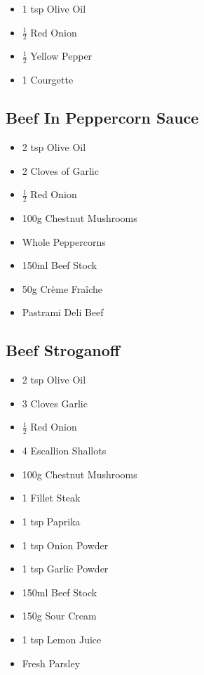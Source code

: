 \documentclass[11pt, english]{article}
\begin{document}
	\begin{itemize}
        \setlength\itemsep{0cm}
		\item 1 tsp Olive Oil
		\item $\frac{1}{2}$ Red Onion
		\item $\frac{1}{2}$ Yellow Pepper
		\item 1 Courgette
        \end{itemize}

\newpage

	\subsection{Beef In Peppercorn Sauce}

	\begin{itemize}
        \setlength\itemsep{0cm}
		\item 2 tsp Olive Oil
		\item 2 Cloves of Garlic
		\item $\frac{1}{2}$ Red Onion
		\item 100g Chestnut Mushrooms
		\item Whole Peppercorns
		\item 150ml Beef Stock
		\item 50g Cr\`{e}me Fra\^{i}che 
		\item Pastrami Deli Beef
        \end{itemize}

\newpage

	\subsection{Beef Stroganoff}

	\begin{itemize}
	\setlength\itemsep{0cm}
		\item 2 tsp Olive Oil
		\item 3 Cloves Garlic
		\item $\frac{1}{2}$ Red Onion
		\item 4 Escallion Shallots
		\item 100g Chestnut Mushrooms
		\item 1 Fillet Steak
		\item 1 tsp Paprika
		\item 1 tsp Onion Powder
		\item 1 tsp Garlic Powder
		\item 150ml Beef Stock
		\item 150g Sour Cream
		\item 1 tsp Lemon Juice
		\item Fresh Parsley
	\end{itemize}
\end{document}
